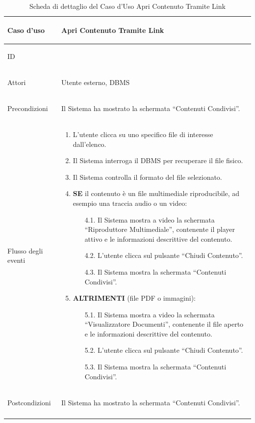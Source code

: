 \documentclass[12pt,a4paper]{article}
\begin{document}
\small
\begin{longtable}{|
>{\columncolor{unipablue}\color{white}\bfseries\raggedright\arraybackslash}p{3.4cm}|
>{\raggedright\arraybackslash}p{11.1cm}|}
\hline
Caso d'uso & Apri Contenuto Tramite Link \\ \hline
ID & 6.2 \\ \hline
Attori & Utente esterno, DBMS \\ \hline
Precondizioni & Il Sistema ha mostrato la schermata ``Contenuti Condivisi''. \\ \hline
Flusso degli eventi &
\begin{enumerate}[topsep=0.2em,itemsep=0.15em,parsep=0pt,partopsep=0pt]
    \item L'utente clicca su uno specifico file di interesse dall'elenco.
    \item Il Sistema interroga il DBMS per recuperare il file fisico.
    \item Il Sistema controlla il formato del file selezionato.
    \item \textbf{SE} il contenuto è un file multimediale riproducibile, ad esempio una traccia audio o un video:
    \begin{itemize}[topsep=0.15em,itemsep=0.1em,parsep=0pt,partopsep=0pt]
        \item[4.1.] Il Sistema mostra a video la schermata ``Riproduttore Multimediale'', contenente il player attivo e le informazioni descrittive del contenuto.
        \item[4.2.] L'utente clicca sul pulsante ``Chiudi Contenuto''.
        \item[4.3.] Il Sistema mostra la schermata ``Contenuti Condivisi''.
    \end{itemize}
    \item \textbf{ALTRIMENTI} (file PDF o immagini):
    \begin{itemize}[topsep=0.15em,itemsep=0.1em,parsep=0pt,partopsep=0pt]
        \item[5.1.] Il Sistema mostra a video la schermata ``Visualizzatore Documenti'', contenente il file aperto e le informazioni descrittive del contenuto.
        \item[5.2.] L'utente clicca sul pulsante ``Chiudi Contenuto''.
        \item[5.3.] Il Sistema mostra la schermata ``Contenuti Condivisi''.
    \end{itemize}
\end{enumerate} \\ \hline
Postcondizioni & Il Sistema ha mostrato la schermata ``Contenuti Condivisi''. \\ \hline
\caption{Scheda di dettaglio del Caso d'Uso Apri Contenuto Tramite Link}
\label{tab:uc_apri_contenuto_tramite_link}\\
\end{longtable}
\normalsize
\end{document}

